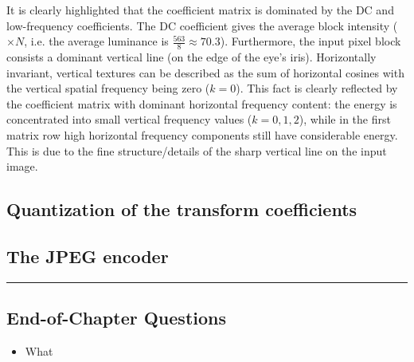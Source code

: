 It is clearly highlighted that the coefficient matrix is dominated by the DC and low-frequency coefficients.
The DC coefficient gives the average block intensity ($\times N$, i.e. the average luminance is $ \frac{563}{8} \approx 70.3$).
Furthermore, the input pixel block consists a dominant vertical line (on the edge of the eye's iris).
Horizontally invariant, vertical textures can be described as the sum of horizontal cosines with the vertical spatial frequency being zero ($k = 0$).
This fact is clearly reflected by the coefficient matrix with dominant horizontal frequency content: the energy is concentrated into small vertical frequency values ($k = 0, 1,2 $), while in the first matrix row high horizontal frequency components still have considerable energy.
This is due to the fine structure/details of the sharp vertical line on the input image.

\subsection{Quantization of the transform coefficients}

\subsection{The JPEG encoder}


\vspace{2cm}
\noindent\rule{12cm}{0.4pt}

\subsection*{End-of-Chapter Questions}

\begin{itemize}
\item What 
\end{itemize}
